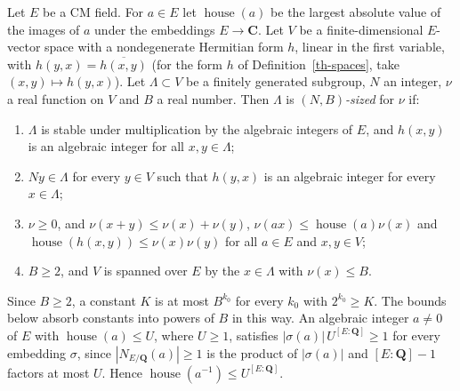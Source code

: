 \begin{definition}\label{th-sized-lattice}
Let $E$ be a CM field. For $a\in E$ let $\operatorname{house}(a)$ be the largest
absolute value of the images of $a$ under the embeddings $E\to\mathbf C$. Let
$V$ be a finite-dimensional $E$-vector space with a nondegenerate Hermitian form
$h$, linear in the first variable, with $h(y,x)=\overline{h(x,y)}$ (for the
form $h$ of Definition~\ref{th-spaces}, take $(x,y)\mapsto h(y,x)$). Let
$\Lambda\subset V$ be a finitely generated subgroup, $N$ an integer, $\nu$ a
real function on $V$ and $B$ a real number. Then $\Lambda$ is
\emph{$(N,B)$-sized} for $\nu$ if:
\begin{enumerate}
\item $\Lambda$ is stable under multiplication by the algebraic integers of $E$,
  and $h(x,y)$ is an algebraic integer for all $x,y\in\Lambda$;
\item $Ny\in\Lambda$ for every $y\in V$ such that $h(y,x)$ is an algebraic
  integer for every $x\in\Lambda$;
\item $\nu\geq0$, and $\nu(x+y)\leq\nu(x)+\nu(y)$,
  $\nu(ax)\leq\operatorname{house}(a)\nu(x)$ and
  $\operatorname{house}(h(x,y))\leq\nu(x)\nu(y)$ for all $a\in E$ and
  $x,y\in V$;
\item $B\geq2$, and $V$ is spanned over $E$ by the $x\in\Lambda$ with
  $\nu(x)\leq B$.
\end{enumerate}
\end{definition}

Since $B\geq2$, a constant $K$ is at most $B^{k_0}$ for every $k_0$ with
$2^{k_0}\geq K$. The bounds below absorb constants into powers of $B$ in this
way. An algebraic integer $a\neq0$ of $E$ with $\operatorname{house}(a)\leq U$,
where $U\geq1$, satisfies $|\sigma(a)|\,U^{[E:\mathbf Q]}\geq1$ for every embedding
$\sigma$, since $|N_{E/\mathbf Q}(a)|\geq1$ is the product of $|\sigma(a)|$ and
$[E:\mathbf Q]-1$ factors at most $U$. Hence
$\operatorname{house}(a^{-1})\leq U^{[E:\mathbf Q]}$.

